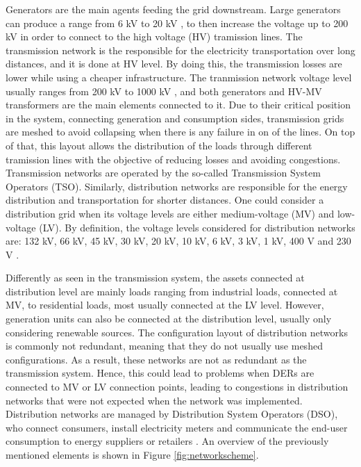 Generators are the main agents feeding the grid downstream. Large generators can produce a range from 6 kV to 20 kV \cite{Gomez-Exposito2008}, to then increase the voltage up to 200 kV in order to connect to the high voltage (HV) tramission lines. The transmission network is the responsible for the electricity transportation over long distances, and it is done at HV level. By doing this, the transmission losses are lower while using a cheaper infrastructure. The tranmission network voltage level usually ranges from 200 kV to 1000 kV \cite{Erbach2016}, and both generators and HV-MV transformers are the main elements connected to it. Due to their critical position in the system, connecting generation and consumption sides, transmission grids are meshed to avoid collapsing when there is any failure in on of the lines. On top of that, this layout allows the distribution of the loads through different tramission lines with the objective of reducing losses and avoiding congestions. Transmission networks are operated by the so-called Transmission System Operators (TSO). Similarly, distribution networks are responsible for the energy distribution and transportation for shorter distances. One could consider a distribution grid when its voltage levels are either medium-voltage (MV) and low-voltage (LV). By definition, the voltage levels considered for distribution networks are: 132 kV, 66 kV, 45 kV, 30 kV, 20 kV, 10 kV, 6 kV, 3 kV, 1 kV, 400 V and 230 V \cite{Gomez-Exposito2008, Erbach2016}. 

Differently as seen in the transmission system, the assets connected at distribution level are mainly loads ranging from industrial loads, connected at MV, to residential loads, most usually connected at the LV level. However, generation units can also be connected  at the distribution level, usually only considering renewable sources. The configuration layout of distribution networks is commonly not redundant, meaning that they do not usually use meshed configurations. As a result, these networks are not as redundant as the transmission system. Hence, this could lead to problems when DERs are connected to MV or LV connection points, leading to congestions  in distribution networks that were not expected when the network was implemented. Distribution networks are managed by Distribution System Operators (DSO), who connect consumers, install electricity meters and communicate the end-user consumption to energy suppliers or retailers \cite{Erbach2016}. An overview of the previously mentioned elements is shown in Figure \ref{fig:networkscheme}. 


